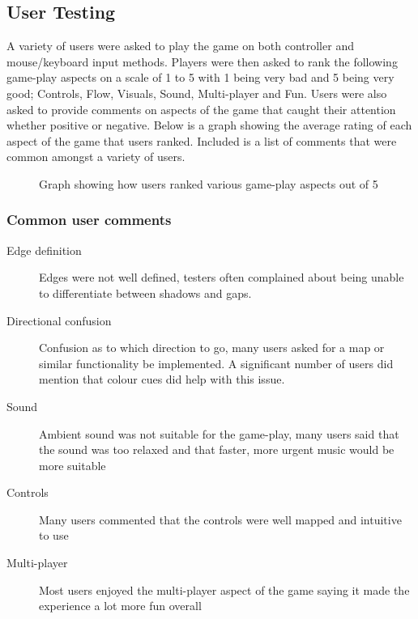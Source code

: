 \documentclass[11pt,a4paper]{article}
\begin{document}
\subsection {User Testing}
A variety of users were asked to play the game on both controller and mouse/keyboard input methods. Players were then asked to rank the following game-play aspects on a scale of 1 to 5 with 1 being very bad and 5 being very good; Controls, Flow, Visuals, Sound, Multi-player and Fun. Users were also asked to provide comments on aspects of the game that caught their attention whether positive or negative. Below is a graph showing the average rating of each aspect of the game that users ranked. Included is a list of comments that were common amongst a variety of users.
\begin{figure}[H]
	\caption{Graph showing how users ranked various game-play aspects out of 5}
	\label{fig:userTestGraph}
\end{figure}
\subsubsection{Common user comments}
\begin{description}
	\item [Edge definition] Edges were not well defined, testers often complained about being unable to differentiate between shadows and gaps.
	\item [Directional confusion] Confusion as to which direction to go, many users asked for a map or similar functionality be implemented. A significant number of users did mention that colour cues did help with this issue.
	\item [Sound] Ambient sound was not suitable for the game-play, many users said that the sound was too relaxed and that faster, more urgent music would be more suitable
	\item [Controls] Many users commented that the controls were well mapped and intuitive to use
	\item [Multi-player] Most users enjoyed the multi-player aspect of the game saying it made the experience a lot more fun overall
\end{description}
\end{document}
